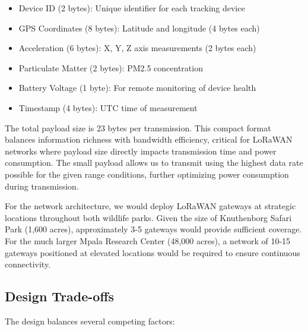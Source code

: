 \begin{itemize}
  \item Device ID (2 bytes): Unique identifier for each tracking device
  \item GPS Coordinates (8 bytes): Latitude and longitude (4 bytes each)
  \item Acceleration (6 bytes): X, Y, Z axis measurements (2 bytes each)
  \item Particulate Matter (2 bytes): PM2.5 concentration
  \item Battery Voltage (1 byte): For remote monitoring of device health
  \item Timestamp (4 bytes): UTC time of measurement
\end{itemize}

The total payload size is 23 bytes per transmission. This compact format balances information richness with bandwidth efficiency, critical for LoRaWAN networks where payload size directly impacts transmission time and power consumption. The small payload allows us to transmit using the highest data rate possible for the given range conditions, further optimizing power consumption during transmission.

For the network architecture, we would deploy LoRaWAN gateways at strategic locations throughout both wildlife parks. Given the size of Knuthenborg Safari Park (1,600 acres), approximately 3-5 gateways would provide sufficient coverage. For the much larger Mpala Research Center (48,000 acres), a network of 10-15 gateways positioned at elevated locations would be required to ensure continuous connectivity.

\subsection{Design Trade-offs}
The design balances several competing factors:

